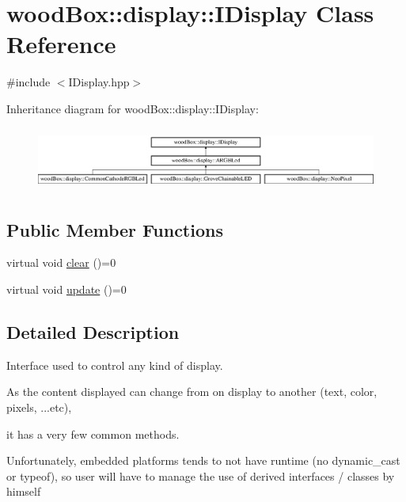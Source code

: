\hypertarget{classwood_box_1_1display_1_1_i_display}{}\section{wood\+Box\+:\+:display\+:\+:I\+Display Class Reference}
\label{classwood_box_1_1display_1_1_i_display}


{\ttfamily \#include $<$I\+Display.\+hpp$>$}

Inheritance diagram for wood\+Box\+:\+:display\+:\+:I\+Display\+:\begin{figure}[H]
\begin{center}
\leavevmode
\includegraphics[height=2.121212cm]{classwood_box_1_1display_1_1_i_display}
\end{center}
\end{figure}
\subsection*{Public Member Functions}
\begin{DoxyCompactItemize}
\item 
virtual void \mbox{\hyperlink{classwood_box_1_1display_1_1_i_display_a7030f0768c1ef15ce936a259406168dc}{clear}} ()=0
\item 
virtual void \mbox{\hyperlink{classwood_box_1_1display_1_1_i_display_ad8c0811b8b807ce119a06c7806004de7}{update}} ()=0
\end{DoxyCompactItemize}


\subsection{Detailed Description}
Interface used to control any kind of display.

As the content displayed can change from on display to another (text, color, pixels, ...etc),

it has a very few common methods.

Unfortunately, embedded platforms tends to not have runtime (no {\ttfamily dynamic\+\_\+cast} or {\ttfamily typeof}), so user will have to manage the use of derived interfaces / classes by himself 

